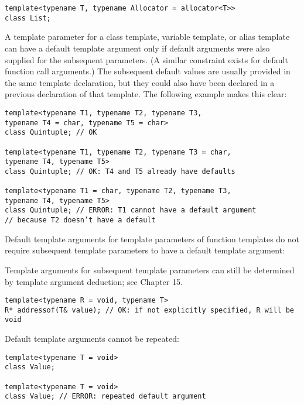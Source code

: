 \begin{lstlisting}[style=styleCXX]
template<typename T, typename Allocator = allocator<T>>
class List;
\end{lstlisting}

A template parameter for a class template, variable template, or alias template can have a default template argument only if default arguments were also supplied for the subsequent parameters. (A similar constraint exists for default function call arguments.) The subsequent default values are usually provided in the same template declaration, but they could also have been declared in a previous declaration of that template. The following example makes this clear:

\begin{lstlisting}[style=styleCXX]
template<typename T1, typename T2, typename T3,
typename T4 = char, typename T5 = char>
class Quintuple; // OK

template<typename T1, typename T2, typename T3 = char,
typename T4, typename T5>
class Quintuple; // OK: T4 and T5 already have defaults

template<typename T1 = char, typename T2, typename T3,
typename T4, typename T5>
class Quintuple; // ERROR: T1 cannot have a default argument
// because T2 doesn’t have a default
\end{lstlisting}

Default template arguments for template parameters of function templates do not require subsequent template parameters to have a default template argument:

\begin{tcolorbox}[colback=webgreen!5!white,colframe=webgreen!75!black]
\hspace*{0.75cm}Template arguments for subsequent template parameters can still be determined by template argument deduction; see Chapter 15.
\end{tcolorbox}

\begin{lstlisting}[style=styleCXX]
template<typename R = void, typename T>
R* addressof(T& value); // OK: if not explicitly specified, R will be void
\end{lstlisting}

Default template arguments cannot be repeated:

\begin{lstlisting}[style=styleCXX]
template<typename T = void>
class Value;

template<typename T = void>
class Value; // ERROR: repeated default argument
\end{lstlisting}

